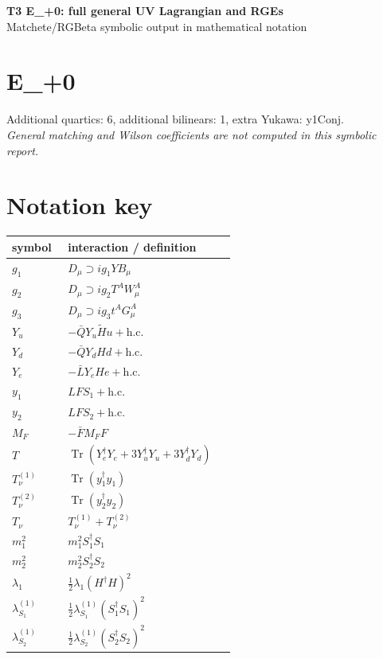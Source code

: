 \documentclass[10pt,a4paper]{article}
\begin{document}
\begin{center}
{\Large\bfseries T3 E\_+0: full general UV Lagrangian and RGEs}\\[4pt]
Matchete/RGBeta symbolic output in mathematical notation
\end{center}
\bigskip
\section*{E\_+0}
Additional quartics: 6, additional bilinears: 1, extra Yukawa: y1Conj.\\
\emph{General matching and Wilson coefficients are not computed in this symbolic report.}
\section*{Notation key}
\begin{longtable}{@{}p{0.23\linewidth}p{0.69\linewidth}@{}}
\toprule
symbol & interaction / definition \\
\midrule
$g_1$ & $D_\mu\supset i g_1YB_\mu$ \\
$g_2$ & $D_\mu\supset i g_2T^AW_\mu^A$ \\
$g_3$ & $D_\mu\supset i g_3t^AG_\mu^A$ \\
$Y_u$ & $-\bar QY_u\widetilde Hu+\mathrm{h.c.}$ \\
$Y_d$ & $-\bar QY_dHd+\mathrm{h.c.}$ \\
$Y_e$ & $-\bar LY_eHe+\mathrm{h.c.}$ \\
$y_1$ & $LFS_1+\mathrm{h.c.}$ \\
$y_2$ & $LFS_2+\mathrm{h.c.}$ \\
$M_F$ & $-\bar FM_FF$ \\
$T$ & $\operatorname{Tr}(Y_e^\dagger Y_e+3Y_u^\dagger Y_u+3Y_d^\dagger Y_d)$ \\
$T_\nu^{(1)}$ & $\operatorname{Tr}(y_1^\dagger y_1)$ \\
$T_\nu^{(2)}$ & $\operatorname{Tr}(y_2^\dagger y_2)$ \\
$T_\nu$ & $T_\nu^{(1)}+T_\nu^{(2)}$ \\
$m_1^2$ & $m_1^2S_1^\dagger S_1$ \\
$m_2^2$ & $m_2^2S_2^\dagger S_2$ \\
$\lambda_1$ & $\frac12\lambda_1(H^\dagger H)^2$ \\
$\lambda_{S_1}^{(1)}$ & $\frac12\lambda_{S_1}^{(1)}(S_1^\dagger S_1)^2$ \\
$\lambda_{S_2}^{(1)}$ & $\frac12\lambda_{S_2}^{(1)}(S_2^\dagger S_2)^2$ \\

\end{longtable}
\end{document}
